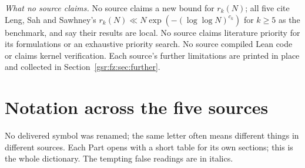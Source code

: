 \documentclass[11pt,letterpaper]{article}
\numberwithin{equation}{section}
\theoremstyle{definition}
\theoremstyle{remark}
\newcommand{\1}{\mathbf 1}
\begin{document}
\emph{What no source claims.} No source claims a new bound for $r_k(N)$; all five cite Leng, Sah and Sawhney's $r_k(N)\ll N\exp(-(\log\log N)^{c_k})$ for $k\ge5$ \cite{lssbounds} as the benchmark, and say their results are local. No source claims literature priority for its formulations or an exhaustive priority search. No source compiled Lean code or claims kernel verification. Each source's further limitations are printed in place and collected in Section~\ref{gsr:fz:sec:further}.

\section{Notation across the five sources}\label{gsr:fm:sec:notation}
No delivered symbol was renamed; the same letter often means different things in different sources. Each Part opens with a short table for its own sections; this is the whole dictionary. The tempting false readings are in italics.
\end{document}
